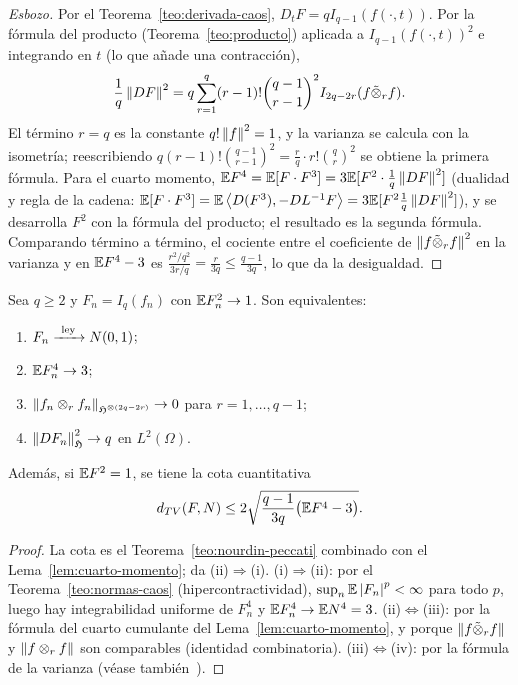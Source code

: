\begin{proof}[Esbozo]
Por el Teorema~\ref{teo:derivada-caos}, $D_tF=qI_{q-1}(f(\cdot,t))$. Por la fórmula del producto (Teorema~\ref{teo:producto})
aplicada a $I_{q-1}(f(\cdot,t))^2$ e integrando en $t$ (lo que añade una contracción),
\[
  \frac1q\left\lVert DF\right\rVert^2=q\sum_{r=1}^q(r-1)!\binom{q-1}{r-1}^2I_{2q-2r}(f\tilde\otimes_rf).
\]
El término $r=q$ es la constante $q!\left\lVert f\right\rVert^2=1$, y la varianza se calcula con la isometría;
reescribiendo $q(r-1)!\binom{q-1}{r-1}^2=\frac rq\cdot r!\binom qr^2$ se obtiene la primera fórmula. Para el cuarto momento,
$\mathbb{E} F^4=\mathbb{E}[F\cdot F^3]=3\mathbb{E}[F^2\cdot\frac1q\left\lVert DF\right\rVert^2]$ (dualidad y regla de la cadena: $\mathbb{E}[F\cdot F^3]=
\mathbb{E}\left\langle D(F^3), -DL^{-1}F\right\rangle=3\mathbb{E}[F^2\frac1q\left\lVert DF\right\rVert^2]$), y se desarrolla $F^2$ con la fórmula del producto; el
resultado es la segunda fórmula. Comparando término a término, el cociente entre el coeficiente
de $\left\lVert f\tilde\otimes_rf\right\rVert^2$ en la varianza y en $\mathbb{E} F^4-3$ es $\frac{r^2/q^2}{3r/q}=\frac r{3q}\le\frac{q-1}{3q}$, lo que da la desigualdad.
\end{proof}

\begin{teorema}\label{teo:cuarto-momento}
Sea $q\ge2$ y $F_n=I_q(f_n)$ con $\mathbb{E} F_n^2\to1$. Son
equivalentes:
\begin{enumerate}[label=(\roman*)]
  \item $F_n\xrightarrow{\ \mathrm{ley}\ } N(0,1)$;
  \item $\mathbb{E} F_n^4\to3$;
  \item $\left\lVert f_n\otimes_rf_n\right\rVert_{\mathfrak{H}^{\otimes(2q-2r)}}\to0$ para $r=1,\dots,q-1$;
  \item $\left\lVert DF_n\right\rVert^2_{\mathfrak{H}}\to q$ en $L^2(\Omega)$.
\end{enumerate}
Además, si $\mathbb{E} F^2=1$, se tiene la cota cuantitativa
\[
  d_{TV}(F,N)\le2\sqrt{\frac{q-1}{3q}\big(\mathbb{E} F^4-3\big)}.
\]
\end{teorema}

\begin{proof}
La cota es el Teorema~\ref{teo:nourdin-peccati} combinado con el Lema~\ref{lem:cuarto-momento}; da (ii)$\Rightarrow$(i). (i)$\Rightarrow$(ii): por
el Teorema~\ref{teo:normas-caos} (hipercontractividad), $\sup_n\mathbb{E}\left\lvert F_n\right\rvert^p<\infty$ para todo $p$, luego hay integrabilidad
uniforme de $F_n^4$ y $\mathbb{E} F_n^4\to\mathbb{E} N^4=3$. (ii)$\Leftrightarrow$(iii): por la fórmula del cuarto cumulante del
Lema~\ref{lem:cuarto-momento}, y porque $\left\lVert f\tilde\otimes_rf\right\rVert$ y $\left\lVert f\otimes_rf\right\rVert$ son comparables (identidad combinatoria). (iii)$\Leftrightarrow$(iv):
por la fórmula de la varianza (véase también~\cite{NualartOrtizLatorre08}).
\end{proof}

